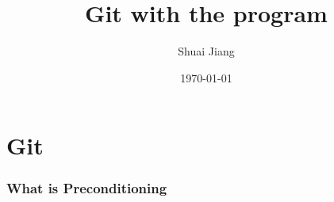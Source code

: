 \documentclass{beamer}
\title{Git with the program}
\date{\today}
\author{Shuai Jiang}
\institute{Brown University}
\begin{document}


\maketitle

\section{Git}
\begin{frame}
	\frametitle{What is Preconditioning}

\end{frame}
\end{document}
